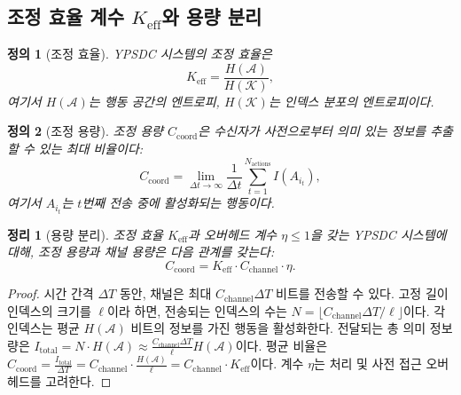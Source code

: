 \documentclass[12pt,a4paper]{article}
\newtheorem{definition}{정의}
\newtheorem{theorem}{정리}
\begin{document}
	\subsection{조정 효율 계수 \(K_{\mathrm{eff}}\)와 용량 분리}
	
	\begin{definition}[조정 효율]
		YPSDC 시스템의 \emph{조정 효율}은
		\begin{equation}
			K_{\mathrm{eff}} = \frac{H(\mathcal{A})}{H(\mathcal{K})},
			\label{eq:Kdef}
		\end{equation}
		여기서 \(H(\mathcal{A})\)는 행동 공간의 엔트로피, \(H(\mathcal{K})\)는 인덱스 분포의 엔트로피이다.
	\end{definition}
	
	\begin{definition}[조정 용량]
		\emph{조정 용량} \(C_{\mathrm{coord}}\)은 수신자가 사전으로부터 의미 있는 정보를 추출할 수 있는 최대 비율이다:
		\begin{equation}
			C_{\mathrm{coord}} = \lim_{\Delta t \to \infty} \frac{1}{\Delta t} \sum_{t=1}^{N_{\mathrm{actions}}} I(A_{i_t}),
		\end{equation}
		여기서 \(A_{i_t}\)는 $t$번째 전송 중에 활성화되는 행동이다.
	\end{definition}
	
	\begin{theorem}[용량 분리]
		\label{thm:capacity-separation}
		조정 효율 \(K_{\mathrm{eff}}\)과 오버헤드 계수 \(\eta \le 1\)을 갖는 YPSDC 시스템에 대해, 조정 용량과 채널 용량은 다음 관계를 갖는다:
		\begin{equation}
			\boxed{C_{\mathrm{coord}} = K_{\mathrm{eff}} \cdot C_{\mathrm{channel}} \cdot \eta}.
			\label{eq:capacity-separation}
		\end{equation}
	\end{theorem}
	
	\begin{proof}
		시간 간격 \(\Delta T\) 동안, 채널은 최대 \(C_{\mathrm{channel}} \Delta T\) 비트를 전송할 수 있다. 고정 길이 인덱스의 크기를 \(\ell\)이라 하면, 전송되는 인덱스의 수는 \(N = \lfloor C_{\mathrm{channel}} \Delta T / \ell \rfloor\)이다. 각 인덱스는 평균 \(H(\mathcal{A})\) 비트의 정보를 가진 행동을 활성화한다. 전달되는 총 의미 정보량은 \(I_{\mathrm{total}} = N \cdot H(\mathcal{A}) \approx \frac{C_{\mathrm{channel}} \Delta T}{\ell} H(\mathcal{A})\)이다. 평균 비율은 \(C_{\mathrm{coord}} = \frac{I_{\mathrm{total}}}{\Delta T} = C_{\mathrm{channel}} \cdot \frac{H(\mathcal{A})}{\ell} = C_{\mathrm{channel}} \cdot K_{\mathrm{eff}}\)이다. 계수 \(\eta\)는 처리 및 사전 접근 오버헤드를 고려한다.
	\end{proof}
	
\end{document}
